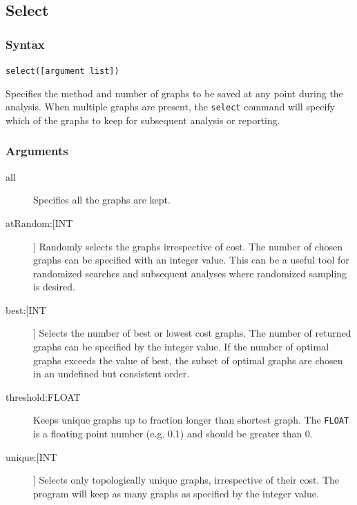 \subsection{Select}
	\subsubsection{Syntax}
		\texttt{select([argument list])}
	
	\begin{phygdescription}
		{Specifies the method and number of graphs to be saved at any point during the 
		analysis. When multiple graphs are present, the \texttt{select} command will specify 
		which of the graphs to keep for subsequent analysis or reporting.}
	\end{phygdescription}
				
	\subsubsection{Arguments}
		\begin{description}
			\item[all] Specifies all the graphs are kept.
		
			\item[atRandom:[INT]] Randomly selects the graphs irrespective of cost. The 
			number of chosen graphs can be specified with an integer value. This can 
			be a useful tool for randomized searches and subsequent analyses where 
			randomized sampling is desired.
			
			\item[best:[INT]] Selects the number of best or lowest cost graphs. The 
			number of returned graphs can be specified by the integer value. If the number 
			of optimal graphs exceeds the value of best, the subset of optimal graphs are chosen 
			in an undefined but consistent order.
							
			\item[threshold:FLOAT] Keeps unique graphs up to fraction longer than shortest 
			graph. The \texttt{FLOAT} is a floating point number (e.g. 0.1) and should be 
			greater than 0.
			
			\item[unique:[INT]] Selects only topologically unique graphs, irrespective of their
			cost. The program will keep as many graphs as specified by the integer value.
		\end{description}

